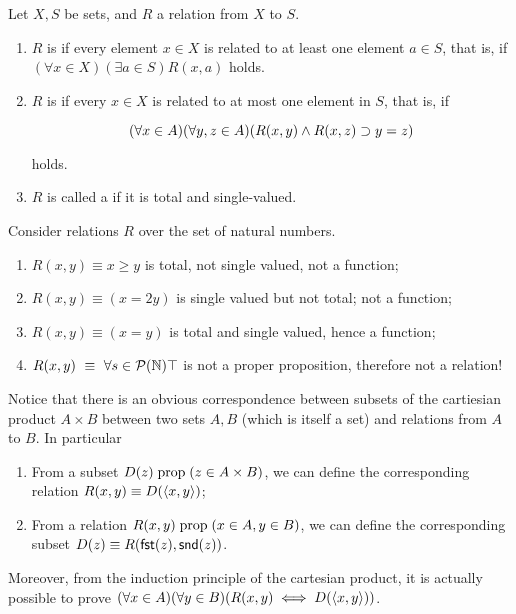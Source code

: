 \begin{definition}
  Let $X,S$ be sets, and $R$ a relation from $X$ to $S$.
  
  \begin{enumerate}
  \item $R$ is  if every element \(x \in X\) is related to at
    least one element \(a \in S\), that is, if
    \((\forall x \in X)(\exists a \in S)R(x, a)\) holds.

  \item $R$ is  if every \(x \in X\) is related to
    at most one element in $S$, that is, if

    \[
      \forallconn{x}{A}{
        \forallconn{y,z}{A}{
          (\implconn{
            \andconn{R(x,y)}{R(x,z)}
          }{
            y = z
          })
        }
      }
    \]

    holds.

  \item $R$ is called a  if it is total and single-valued.
  \end{enumerate}
\end{definition}

\begin{example}
  Consider relations $R$ over the set of natural numbers.

  \begin{enumerate}
  \item $R(x,y) \equiv  x \geq y$ is total, not single valued, not a function;
  \item $R(x,y) \equiv (x = 2y)$ is single valued but not total; not a function;
  \item $R(x,y) \equiv (x = y)$ is total and single valued, hence a function;
  \item $R(x,y)\ \equiv\ \forall s \in \mathcal{P}(\mathbb{N}) \top$ is not a proper proposition,
    therefore not a relation!
  \end{enumerate}
\end{example}

\begin{example}
  Notice that there is an obvious correspondence between subsets of the
  cartiesian product $A \times B$ between two sets $A,B$ (which is itself a set)
  and relations from $A$ to $B$. In particular

  \begin{enumerate}
  \item From a subset $D(z) \; \text{prop} \; (z \in A\times B)$, we can define the
    corresponding relation $R(x,y) \equiv D(\langle x, y \rangle)$;
  \item From a relation $R(x,y) \; \text{prop} \; (x \in A,y \in B)$, we can define
    the corresponding subset $D(z) \equiv R(\textsf{fst}(z),\textsf{snd}(z))$.
  \end{enumerate}

  Moreover, from the induction principle of the cartesian product, it is
  actually possible to prove
  $(\forall x \in A)(\forall y \in B)(R(x,y) \iff D(\langle x, y \rangle))$.
\end{example}

